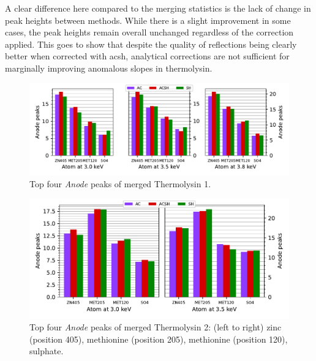 A clear difference here compared to the merging statistics is the lack of change in peak heights between methods. While there is a slight improvement in some cases, the peak heights remain overall unchanged regardless of the correction applied. This goes to show that despite the quality of reflections being clearly better when corrected with \ac{acsh}, analytical corrections are not sufficient for marginally improving anomalous slopes in thermolysin.%

\begin{figure}[h]
    \centering
    \includegraphics[width = 1.0 \textwidth]{plots/exp1/tlys_9_P6122/peaks/merged_peaks_so4.pdf}
    \caption{Top four \textit{Anode} peaks of merged Thermolysin 1.}
    \label{fig:tlys_9_merged_peaks}
\end{figure}

\begin{figure}[h]
    \centering
    \includegraphics[width = 0.9 \textwidth]{plots/exp1/tlys_2_P6122/peaks/merged_peaks.pdf}
    \caption{Top four \textit{Anode} peaks of merged Thermolysin 2: (left to right) zinc (position 405), methionine (position 205), methionine (position 120), sulphate.}
    \label{fig:tlys_2_merged_peaks}
\end{figure}


